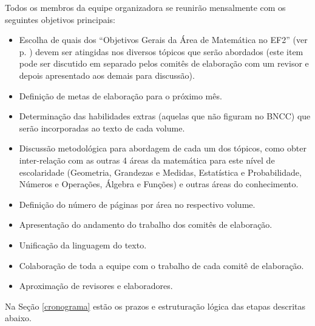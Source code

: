 \documentclass[10 pt]{article}
\begin{document}
Todos os membros da equipe organizadora se reunirão mensalmente com os seguintes objetivos principais:
\begin{itemize}

 \item Escolha de quais dos ``Objetivos Gerais da Área de Matemática no EF2'' (ver p. \pageref{objetivosBNC}) devem ser atingidas nos diversos tópicos que serão abordados (este item pode ser discutido em separado pelos comitês de elaboração com um revisor e depois apresentado aos demais para discussão).
 \item Definição de metas de elaboração para o próximo mês.
 \item Determinação das habilidades extras (aquelas que não figuram no BNCC) que serão incorporadas ao texto de cada volume.
 \item Discussão metodológica para abordagem de cada um dos tópicos, como obter inter-relação com as outras 4 áreas da matemática para este nível de escolaridade (Geometria, Grandezas e Medidas, Estatística e Probabilidade, Números e Operações, Álgebra e Funções) e outras áreas do conhecimento.
 \item Definição do número de páginas por área no respectivo volume.
 \item Apresentação do andamento do trabalho dos comitês de elaboração.
 \item Unificação da linguagem do texto.
 \item Colaboração de toda a equipe com o trabalho de cada comitê de elaboração.
 \item Aproximação de revisores e elaboradores.
\end{itemize}

\clearpage

Na  Seção \ref{cronograma} estão os prazos e estruturação lógica das etapas descritas abaixo.
\end{document}
